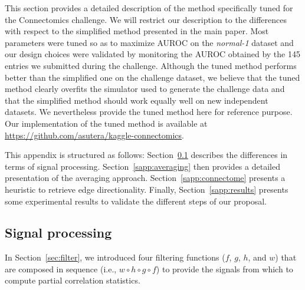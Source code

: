\documentclass[wcp]{jmlr}
\begin{document}
This section provides a detailed description of the method specifically tuned
for the Connectomics challenge. We will restrict our description to the
differences with respect to the simplified method presented in the main
paper. Most parameters were tuned so as to maximize AUROC on the
\textit{normal-1} dataset and our design choices were validated by monitoring
the AUROC obtained by the 145 entries we submitted during the
challenge. Although the tuned method performs better than the simplified one on
the challenge dataset, we believe that the tuned method clearly overfits the
simulator used to generate the challenge data and that the simplified method
should work equally well on new independent datasets. We nevertheless provide
the tuned method here for reference purpose. Our implementation of the tuned
method is available at \url{https://github.com/asutera/kaggle-connectomics}.

This appendix is structured as follows: Section~\ref{sapp:signal} describes the
differences in terms of signal processing. Section~\ref{sapp:averaging} then
provides a detailed presentation of the averaging
approach. Section~\ref{sapp:connectome} presents a heuristic to retrieve edge
directionality. Finally, Section~\ref{sapp:results} presents some experimental
results to validate the different steps of our proposal.


\subsection{Signal processing}
\label{sapp:signal}

In Section~\ref{sec:filter}, we introduced four filtering functions ($f$, $g$,
$h$, and $w$) that are composed in sequence (i.e., $w \circ h \circ g \circ
f$) to provide the signals from which to compute partial correlation
statistics.
\end{document}
